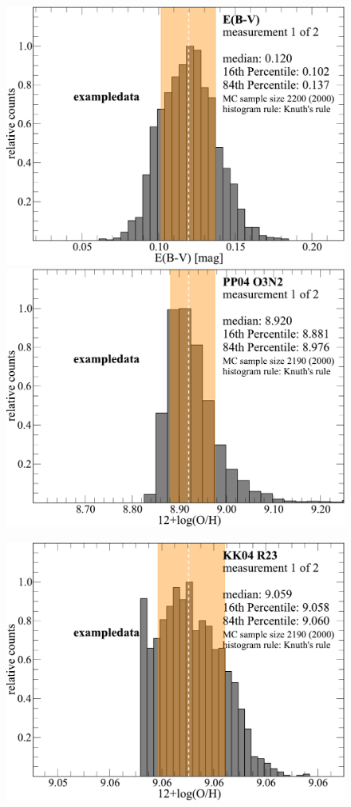 \documentclass{emulateapj}
\begin{document}
\begin{figure}[!ht]
\centerline{
\includegraphics[width=0.98\columnwidth]{exampledata_n2000_EB-V_1.pdf}
\includegraphics[width=0.98\columnwidth]{exampledata_n2000_PP04_O3N2_1.pdf}}
\centerline{
\includegraphics[width=0.98\columnwidth]{exampledata_n2000_KK04_R23_1.pdf}
}
\end{figure}
\end{document}
